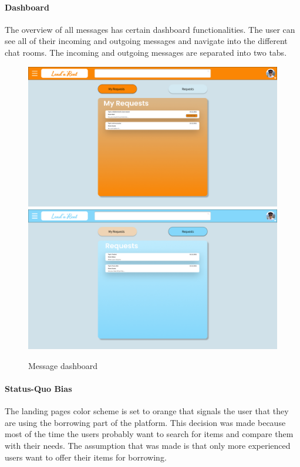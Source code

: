 	\paragraph{Dashboard}
		The overview of all messages has certain dashboard functionalities. The user can see all of their incoming and outgoing messages and navigate into the different chat rooms. The incoming and outgoing messages are separated into two tabs.
		\begin{figure}[H]
			\centering
			\includegraphics[width=0.49\linewidth]{abb/3_design_guidelines/messages_1.png}
			\includegraphics[width=0.49\linewidth]{abb/3_design_guidelines/messages_2.png}
			\caption{Message dashboard}
			\label{fig:message_dashboard}
		\end{figure}
	\par
	
	\paragraph{Status-Quo Bias}
		The landing pages color scheme is set to orange that signals the user that they are using the borrowing part of the platform. This decision was made because most of the time the users probably want to search for items and compare them with their needs. The assumption that was made is that only more experienced users want to offer their items for borrowing.
	\par
	
